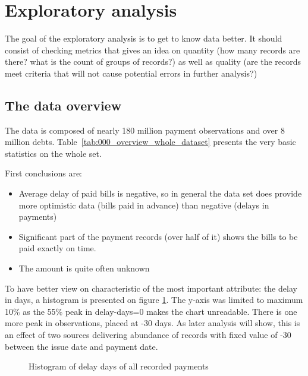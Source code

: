 \documentclass{article}
\begin{document}
\section{Exploratory analysis}

The goal of the exploratory analysis is to get to know data better.
It should consist of checking metrics that gives an idea on quantity (how many records are there? what is the count of groups of records?)
as well as quality (are the records meet criteria that will not cause potential errors in further analysis?)

\subsection{The data overview}

The data is composed of nearly 180 million payment observations and over 8 million debts.
Table\ \ref{tab:000_overview_whole_dataset} presents the very basic statistics on the whole set. \par

First conclusions are:
\begin{itemize}
    \item Average delay of paid bills is negative, so in general the data set does provide more optimistic data (bills paid in advance) than negative (delays in payments)
    \item Significant part of the payment records (over half of it) shows the bills to be paid exactly on time.
    \item The amount is quite often unknown
\end{itemize}

To have better view on characteristic of the most important attribute: the delay in days, a histogram is presented on figure \ref{fig:001_delay_days_hist}.
The y-axis was limited to maximum 10\% as the 55\% peak in delay-days=0 makes the chart unreadable.
There is one more peak in observations, placed at -30 days.
As later analysis will show, this is an effect of two sources delivering abundance of records with fixed value of -30 between the issue date and payment date.\par

\begin{figure}[htbp!]
    \begin{center}
        
    \end{center}
    \caption{Histogram of delay days of all recorded payments}
    \label{fig:001_delay_days_hist}
\end{figure}
\end{document}

